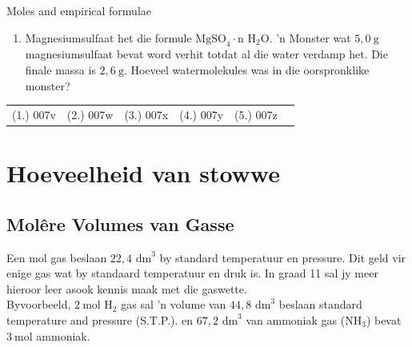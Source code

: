 \begin{exercises}{Moles and empirical formulae}
\begin{enumerate}[noitemsep, label=\textbf{\arabic*}. ]
\item Magnesiumsulfaat het die formule $\text{MgSO}_{4} \cdot \text{n H}_{2}\text{O}$.  'n Monster wat $5,0 ~\text{g}$ magnesiumsulfaat bevat word verhit totdat al die water verdamp het. Die finale massa is $2,6~\text{g}$. Hoeveel watermolekules was in die oorspronklike monster? 
\end{enumerate}
\practiceinfo
\par 
 \par \begin{tabular}[h]{cccccc}
 (1.) 007v  &  (2.) 007w  &  (3.) 007x  &  (4.) 007y  & (5.) 007z \end{tabular}
\end{exercises}
\section{Hoeveelheid van stowwe}
            \subsection*{Mol\^{e}re Volumes van Gasse}
            \nopagebreak
            \par
            \label{m38712*eip-id1168064596799}
  {Een mol gas beslaan $22,4{\text{ dm}}^{3}$ by standard temperatuur en pressure. } 
Dit geld vir enige gas wat by standaard temperatuur en druk is. In graad 11 sal jy meer hieroor leer asook kennis maak met die gaswette.\\
Byvoorbeeld, $2~\text{mol}$ $\text{H}_2$ gas sal  'n volume van $44,8{\text{ dm}}^{3}$ beslaan standard temperature and pressure (S.T.P.). en $67,2{\text{ dm}}^{3}$ van ammoniak gas ($\text{NH}_3$) bevat $3~\text{mol}$ ammoniak.
    \label{m38712*cid8}
